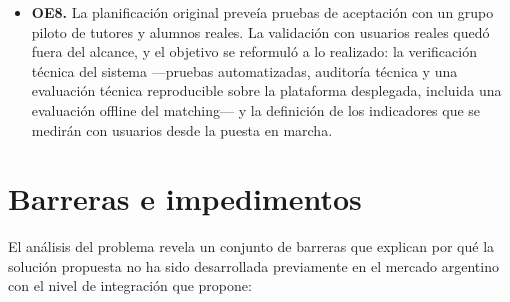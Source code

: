 \begin{itemize}
          el audio no puede anonimizarse antes de salir del servidor, por
          lo que se transcribe primero y el \gls{llm} recibe solo texto
          anonimizado (ADR-M6-03). El asistente conversacional salió del
          alcance: el \gls{mvp} quedó cerrado en nueve módulos y ninguno
          lo contiene, de modo que incorporarlo exigiría una enmienda
          explícita de los principios del proyecto (Constitución del
          proyecto, Art.~VI). Se documenta como trabajo futuro.
    \item \textbf{OE8.} La planificación original preveía pruebas de
          aceptación con un grupo piloto de tutores y alumnos reales. La
          validación con usuarios reales quedó fuera del alcance, y el
          objetivo se reformuló a lo realizado: la verificación técnica
          del sistema ---pruebas automatizadas, auditoría técnica y una
          evaluación técnica reproducible sobre la plataforma desplegada,
          incluida una evaluación offline del \gls{matching}--- y la
          definición de los indicadores que se medirán con usuarios desde
          la puesta en marcha.
\end{itemize}

\section{Barreras e impedimentos}\label{sec:barreras}

El análisis del problema revela un conjunto de barreras que explican por
qué la solución propuesta no ha sido desarrollada previamente en el
mercado argentino con el nivel de integración que \sistema{} propone:

